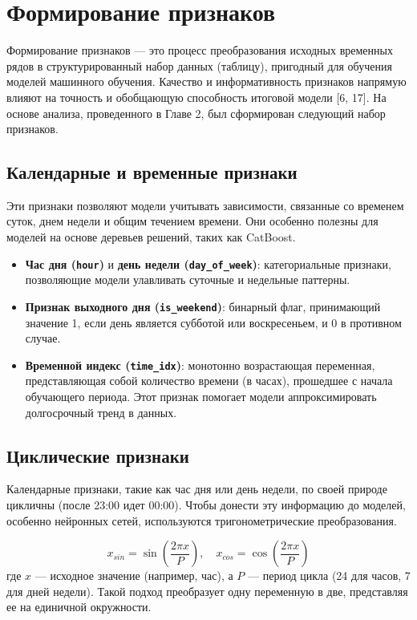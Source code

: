 \section{Формирование признаков}
\label{sec:feature_engineering}

Формирование признаков --- это процесс преобразования исходных временных рядов в структурированный набор данных (таблицу), пригодный для обучения моделей машинного обучения. Качество и информативность признаков напрямую влияют на точность и обобщающую способность итоговой модели [6, 17]. На основе анализа, проведенного в Главе 2, был сформирован следующий набор признаков.

\subsection{Календарные и временные признаки}

Эти признаки позволяют модели учитывать зависимости, связанные со временем суток, днем недели и общим течением времени. Они особенно полезны для моделей на основе деревьев решений, таких как CatBoost.

\begin{itemize}
	\item \textbf{Час дня (\texttt{hour})} и \textbf{день недели (\texttt{day\_of\_week})}: категориальные признаки, позволяющие модели улавливать суточные и недельные паттерны.
	\item \textbf{Признак выходного дня (\texttt{is\_weekend})}: бинарный флаг, принимающий значение 1, если день является субботой или воскресеньем, и 0 в противном случае.
	\item \textbf{Временной индекс (\texttt{time\_idx})}: монотонно возрастающая переменная, представляющая собой количество времени (в часах), прошедшее с начала обучающего периода. Этот признак помогает модели аппроксимировать долгосрочный тренд в данных.
\end{itemize}

\subsection{Циклические признаки}

Календарные признаки, такие как час дня или день недели, по своей природе цикличны (после 23:00 идет 00:00). Чтобы донести эту информацию до моделей, особенно нейронных сетей, используются тригонометрические преобразования.

\begin{equation}
	x_{sin} = \sin\left(\frac{2\pi x}{P}\right), \quad x_{cos} = \cos\left(\frac{2\pi x}{P}\right)
\end{equation}
где $x$ — исходное значение (например, час), а $P$ — период цикла (24 для часов, 7 для дней недели). Такой подход преобразует одну переменную в две, представляя ее на единичной окружности.

